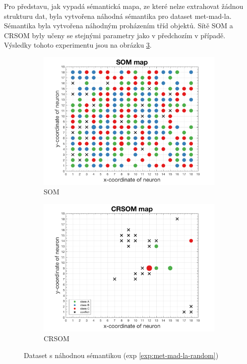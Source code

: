 \documentclass[thesis=M,czech]{FITthesis}[2012/06/26]
\begin{document}
Pro představu, jak vypadá sémantická mapa, ze které nelze extrahovat žádnou strukturu dat, byla vytvořena náhodná sémantika pro dataset met-mad-la. Sémantika byla vytvořena náhodným proházením tříd objektů. Sítě SOM a CRSOM byly učeny  se stejnými parametry jako v předchozím v případě. Výsledky tohoto experimentu jsou na obrázku \ref{fig:metmadlarandom}.

\begin{figure}
\centering
\begin{subfigure}{.5\textwidth}
  \centering
  \includegraphics[width=.99\linewidth]{exp_met_mad_la_random_som.png}
  \caption{SOM}
  \label{fig:sub1}
\end{subfigure}%
\begin{subfigure}{.5\textwidth}
  \centering
  \includegraphics[width=.99\linewidth]{exp_met_mad_la_random_crsom.png}
  \caption{CRSOM}
  \label{fig:sub2}
\end{subfigure}
\caption{Dataset s náhodnou sémantikou (exp \ref{exp:met-mad-la-random})}
\label{fig:metmadlarandom}
\end{figure}
\end{document}

